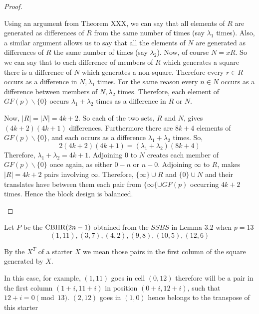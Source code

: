 \begin{proof}
\begin{enumerate}
{    Using an argument from Theorem XXX, we can say that
    all elements of $R$ are generated as differences of $R$
    from the same number of times (say $\lambda _1$ times).
    Also, a similar argument allows us to say that all the
    elements of $N$ are generated as differences of $R$ the
    same number of times (say $\lambda _2$). Now, of course
    $N = xR$. So we can say that to each difference of
    members of $R$ which generates a square there is a
    difference of $N$ which generates a non-square.
    Therefore every $r \in R$ occurs as a difference in
    $N, \lambda _1$ times. For the same reason every
    $n \in N$ occurs as a difference between members of
    $N, \lambda _2$ times. Therefore, each element of
    $GF(p) \backslash \{0\}$ occurs $\lambda _1 + \lambda _2$
    times as a difference in $R$ or $N$.
    
    Now, $|R| = |N| = 4k + 2$. So each of the two sets, $R$
    and $N$, gives $(4k + 2)(4k + 1)$ differences. Furthermore
    there are $8k + 4$ elements of $GF(p) \backslash \{0\}$,
    and each occurs as a difference
    $\lambda _1 + \lambda _2$ times. So,
    \begin{equation}
    2(4k + 2)(4k + 1) = (\lambda _1 + \lambda _2)(8k + 4)
    \end{equation}
    Therefore, $\lambda _1 + \lambda _2 = 4k + 1$.
    Adjoining 0 to $N$ creates each member of
    $GF(p) \backslash \{0\}$ once again, as either $0-n$ or
    $n-0$.
    Adjoining $\infty$ to $R$, makes $|R| = 4k + 2$ pairs
    involving $\infty$. Therefore, $\{\infty\} \cup R$ and
    $\{0\} \cup N$ and their translates have between them
    each pair from $\{\infty\{ \cup GF(p)$ occurring $4k + 2$
    times. Hence the block design is balanced.}
\end{enumerate}
\end{proof}

\begin{example}
Let $P$ be the $\operatorname{CBHR}(2n - 1)$ obtained from the $SSBS$ in Lemma 3.2 when $p = 13$
\begin{equation}
  (1, 11), (3, 7), (4, 2), (9, 8), (10, 5), (12, 6)
\end{equation}
\end{example}

By the  $X^T$ of a starter $X$ we mean those pairs in the first column of the square generated by $X$.

In this case, for example, $(1, 11)$ goes in cell $(0, 12)$ therefore will be a pair in the first column $(1 + i, 11 + i)$ in position $(0 + i, 12 + i)$, such that $12 + i = 0\pmod{13}$. $(2, 12)$ goes in $(1, 0)$ hence belongs to the transpose of this starter


